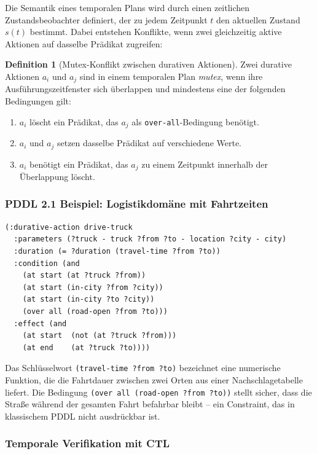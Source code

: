 ﻿\documentclass[a4paper,12pt]{article}
\theoremstyle{definition}
\newtheorem{definition}{Definition}[section]
\begin{document}
Die Semantik eines temporalen Plans wird durch einen zeitlichen Zustandsbeobachter definiert, der zu jedem Zeitpunkt $t$ den aktuellen Zustand $s(t)$ bestimmt. Dabei entstehen Konflikte, wenn zwei gleichzeitig aktive Aktionen auf dasselbe Prädikat zugreifen:

\begin{definition}[Mutex-Konflikt zwischen durativen Aktionen]
Zwei durative Aktionen $a_i$ und $a_j$ sind in einem temporalen Plan \emph{mutex}, wenn ihre Ausführungszeitfenster sich überlappen und mindestens eine der folgenden Bedingungen gilt:
\begin{enumerate}
  \item $a_i$ löscht ein Prädikat, das $a_j$ als \texttt{over-all}-Bedingung benötigt.
  \item $a_i$ und $a_j$ setzen dasselbe Prädikat auf verschiedene Werte.
  \item $a_i$ benötigt ein Prädikat, das $a_j$ zu einem Zeitpunkt innerhalb der Überlappung löscht.
\end{enumerate}
\end{definition}

\subsubsection{PDDL 2.1 Beispiel: Logistikdomäne mit Fahrtzeiten}

\begin{lstlisting}[language=PDDL, caption=Durative Action in PDDL 2.1 -- Logistik mit Fahrtdauer]
(:durative-action drive-truck
  :parameters (?truck - truck ?from ?to - location ?city - city)
  :duration (= ?duration (travel-time ?from ?to))
  :condition (and
    (at start (at ?truck ?from))
    (at start (in-city ?from ?city))
    (at start (in-city ?to ?city))
    (over all (road-open ?from ?to)))
  :effect (and
    (at start  (not (at ?truck ?from)))
    (at end    (at ?truck ?to))))
\end{lstlisting}

Das Schlüsselwort \texttt{(travel-time ?from ?to)} bezeichnet eine numerische Funktion, die die Fahrtdauer zwischen zwei Orten aus einer Nachschlagetabelle liefert. Die Bedingung \texttt{(over all (road-open ?from ?to))} stellt sicher, dass die Straße während der gesamten Fahrt befahrbar bleibt -- ein Constraint, das in klassischem PDDL nicht ausdrückbar ist.

\subsubsection{Temporale Verifikation mit CTL}
\end{document}
